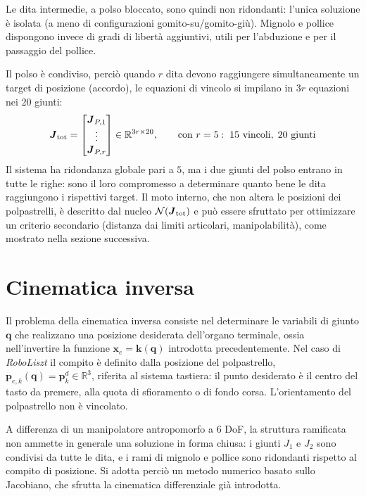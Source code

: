 Le dita intermedie, a polso bloccato, sono quindi non ridondanti: l'unica soluzione è isolata (a meno di configurazioni gomito-su/gomito-giù).
Mignolo e pollice dispongono invece di gradi di libertà aggiuntivi, utili per l'abduzione e per il passaggio del pollice.

Il polso è condiviso, perciò quando $r$ dita devono raggiungere simultaneamente un target di posizione (accordo), le equazioni di vincolo si impilano in $3r$ equazioni nei 20 giunti:
\begin{equation}
    \boldsymbol J_{\rm tot}=\begin{bmatrix}\boldsymbol J_{P,1}\\ \vdots\\ \boldsymbol J_{P,r}\end{bmatrix}\in\mathbb R^{3r\times 20},
    \qquad \text{con } r=5:\; 15\ \text{vincoli},\; 20\ \text{giunti}
\end{equation}
Il sistema ha ridondanza globale pari a $5$, ma i due giunti del polso entrano in tutte le righe: sono il loro compromesso a determinare quanto bene le dita raggiungono i rispettivi target. 
Il moto interno, che non altera le posizioni dei polpastrelli, è descritto dal nucleo $\mathcal N(\boldsymbol J_{\rm tot})$ e può essere sfruttato per ottimizzare un criterio secondario (distanza dai limiti articolari, manipolabilità), come mostrato nella sezione successiva.


\section{Cinematica inversa}
\label{sec:inverse_kinematics}

Il problema della cinematica inversa consiste nel determinare le variabili di giunto $\boldsymbol q$ che realizzano una posizione desiderata dell'organo terminale, ossia nell'invertire la funzione $\boldsymbol x_e=\boldsymbol k(\boldsymbol q)$ introdotta precedentemente. 
Nel caso di \textit{RoboLiszt} il compito è definito dalla posizione del polpastrello, $\boldsymbol p_{e,k}(\boldsymbol q)=\boldsymbol p_k^d\in\mathbb R^3$, riferita al sistema tastiera: il punto desiderato è il centro del tasto da premere, alla quota di sfioramento o di fondo corsa. L'orientamento del polpastrello non è vincolato.

A differenza di un manipolatore antropomorfo a 6 DoF, la struttura ramificata non ammette in generale una soluzione in forma chiusa: i giunti $J_1$ e $J_2$ sono condivisi da tutte le dita, e i rami di mignolo e pollice sono ridondanti rispetto al compito di posizione. 
Si adotta perciò un metodo numerico basato sullo Jacobiano, che sfrutta la cinematica differenziale già introdotta.

